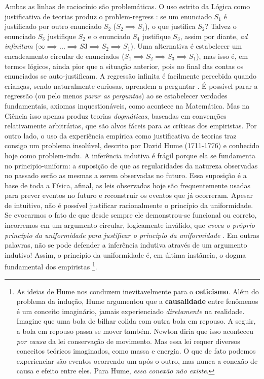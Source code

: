 \documentclass[./main.tex]{subfiles}
\begin{document}
\par Ambas as linhas de raciocínio são problemáticas. O uso estrito da Lógica como justificativa de teorias produz o \gls{problem-regress} \cite{cling2008}: se um enunciado $S_1$ é justificado por outro enunciado $S_2$ ($S_2 \implies S_1$), o que justifica $S_2$? Talvez o enunciado $S_3$ justifique $S_2$ e o enunciado $S_4$ justifique $S_3$, assim por diante, \textit{ad infinitum} ($\infty \implies ... \implies S3 \implies S_2 \implies S_1$). Uma alternativa é estabelecer um encadeamento circular de enunciados  ($S_1 \implies S_2 \implies S_3 \implies S_1$), mas isso é, em termos lógicos, ainda pior que a situação anterior, pois no final das contas os enunciados se auto-justificam. A regressão infinita é facilmente percebida quando crianças, sendo naturalmente curiosas, aprendem a perguntar . É possível parar a regressão (ou pelo menos \textit{parar as perguntas}) ao se estabelecer verdades fundamentais, axiomas inquestionáveis, como acontece na Matemática. Mas na Ciência isso apenas produz teorias \textit{dogmáticas}, baseadas em convenções relativamente arbitrárias, que são alvos fáceis para as críticas dos empiristas. Por outro lado, o uso da experiência empírica como justificativa de teorias traz consigo um problema insolúvel, descrito por David Hume (1711-1776) e conhecido hoje como \gls{problem-indu}. A inferência indutiva é frágil porque ela se fundamenta no \gls{principio-uniform}: a suposição de que as regularidades da natureza observadas no passado serão as mesmas a serem observadas no futuro. Essa suposição é a base de toda a Física, afinal, as leis observadas hoje são frequentemente usadas para prever eventos no futuro e reconstruir os eventos que já ocorreram. Apesar de intuitivo, não é possível justificar racionalmente o princípio da uniformidade. Se evocarmos o fato de que desde sempre ele demonstrou-se funcional ou correto, incorremos em um argumento circular, logicamente inválido, que \textit{evoca o próprio princípio da uniformidade para justificar o princípio da uniformidade} \cite{sep-induction-problem}. Em outras palavras, não se pode defender a inferência indutiva através de um argumento indutivo! Assim, o princípio da uniformidade é, em última instância, o dogma fundamental dos empiristas \footnote{As ideias de Hume nos conduzem inevitavelmente para o \textbf{ceticismo}. Além do problema da indução, Hume argumentou que a \textbf{causalidade} entre fenômenos é um conceito imaginário, jamais experienciado \textit{diretamente} na realidade. Imagine que uma bola de bilhar colida com outra bola em repouso. A seguir, a bola em repouso passa se mover também. Newton diria que isso aconteceu \textit{por causa} da lei conservação de movimento. Mas essa lei requer diversos conceitos teóricos imaginados, como massa e energia. O que de fato podemos experienciar são eventos ocorrendo um após o outro, mas nunca a conexão de causa e efeito entre eles. Para Hume, \textit{essa conexão não existe}. }.    
\end{document}
